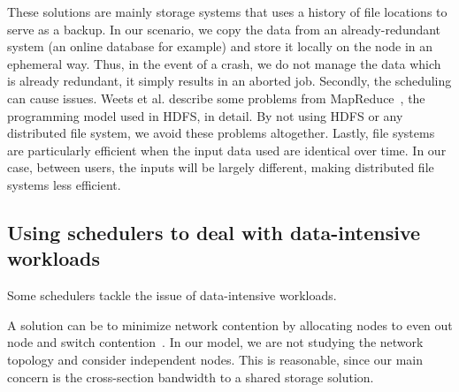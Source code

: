 \documentclass[conference,10pt]{IEEEtran}
\begin{document}
These solutions are mainly storage systems that uses a history of file locations to serve as a backup.
In our scenario, we copy the data from an already-redundant system (an online database for example)
and store it locally on the node in an ephemeral way.
Thus, in the event of a crash, we do not manage the data which is already redundant, it simply results in an aborted job.
Secondly, the scheduling can cause issues. Weets et al. describe some problems from
MapReduce~\cite{issue_with_hdfs}, the programming model used in HDFS, in detail.
By not using HDFS or any distributed file system, we avoid these problems altogether. 
Lastly, file systems are particularly efficient when the input data used are identical over time.
In our case, between users, the inputs will be largely different, making distributed file systems less efficient.




\subsection{Using schedulers to deal with data-intensive workloads}

Some schedulers tackle the issue of data-intensive workloads.

A solution can be to minimize network contention by allocating nodes to even out node and
switch contention~\cite{minimize_network_contention}. 
In our model, we are not studying the network topology and consider independent nodes.
This is reasonable, since our main concern is the cross-section bandwidth to a shared storage solution.
\end{document}
